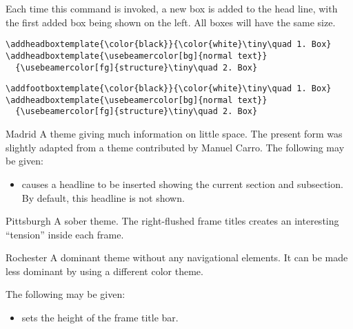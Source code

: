 \begin{command}{\addheadboxtemplate%
    }
  Each time this command is invoked, a new box is added to the head
  line, with the first added box being shown on the left. All boxes
  will have the same size.
  \example
\begin{verbatim}
\addheadboxtemplate{\color{black}}{\color{white}\tiny\quad 1. Box}
\addheadboxtemplate{\usebeamercolor[bg]{normal text}}
  {\usebeamercolor[fg]{structure}\tiny\quad 2. Box}
\end{verbatim}
\end{command}

\begin{command}{\addfootboxtemplate%
    }
  \example
\begin{verbatim}
\addfootboxtemplate{\color{black}}{\color{white}\tiny\quad 1. Box}
\addheadboxtemplate{\usebeamercolor[bg]{normal text}}
  {\usebeamercolor[fg]{structure}\tiny\quad 2. Box}
\end{verbatim}
\end{command}


\begin{themeexample}{Madrid}
  A theme giving much information on little space. The present form
  was slightly adapted from a theme contributed by Manuel Carro.
  The following  may be given:
  \begin{itemize}
  \item {} causes a headline to be inserted showing
    the current section and subsection. By default, this
    headline is not shown.
  \end{itemize}
\end{themeexample}


\begin{themeexample}{Pittsburgh}
  A sober theme. The right-flushed frame titles creates an interesting 
  ``tension'' inside each frame. 
\end{themeexample}


\begin{themeexample}{Rochester}
  A dominant theme without any navigational elements. It can be made less
  dominant by using a different color theme.

  The following  may be given:
  \begin{itemize}
  \item {} sets the height of the
    frame title bar.
  \end{itemize}
\end{themeexample}





